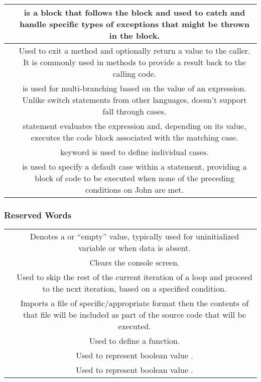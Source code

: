 \begin{center}
\begin{tabulary}{\linewidth}{|C|C|}
     &  is a block that follows the  block and used to catch and handle specific types of exceptions that might be thrown in the  block. \\
    \hline
     & Used to exit a method and optionally return a value to the caller. It is commonly used in methods to provide a result back to the calling code. \\
    \hline
    &  is used for multi-branching based on the value of an expression. Unlike switch statements from other languages,  doesn’t support fall through cases. \\
     &  statement evaluates the expression and, depending on its value, executes the code block associated with the matching case. \\
     &  keyword is used to define individual cases. \\
     &  is used to specify a default case within a  statement, providing a block of code to be executed when none of the preceding conditions on John are met. \\
    \hline
  \end{tabulary}
\end{center}

\subsubsection{Reserved Words}
\begin{center}
  \begin{tabulary}{\linewidth}{|C|C|}
    \hline
     &  \\
    \hline
    \hline
     & Denotes a  or ``empty'' value, typically used for uninitialized variable or when data is absent. \\
    \hline
     & Clears the console screen. \\
    \hline
     & Used to skip the rest of the current iteration of a loop and proceed to the next iteration, based on a specified condition. \\
    \hline
     & Imports a file of specific/appropriate format then the contents of that file will be included as part of the source code that will be executed. \\
     & Used to define a function. \\
    \hline
     & Used to represent boolean value . \\
    \hline
     & Used to represent boolean value .\\
    \hline
  \end{tabulary}
\end{center}
